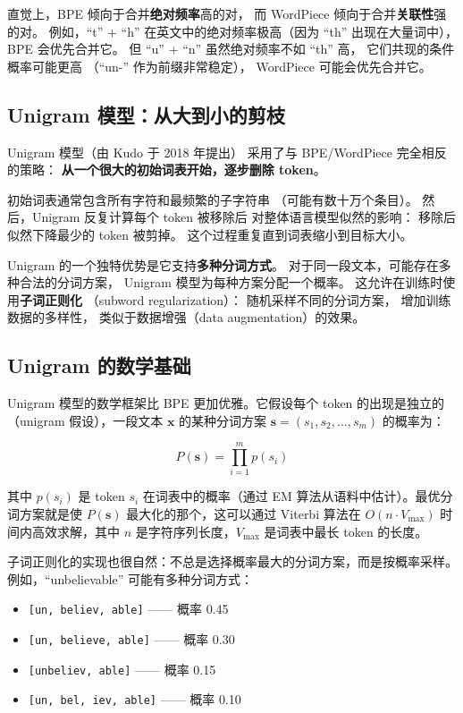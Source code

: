 直觉上，BPE 倾向于合并\textbf{绝对频率}高的对，
而 WordPiece 倾向于合并\textbf{关联性}强的对。
例如，“t” + “h” 在英文中的绝对频率极高（因为 “th” 出现在大量词中），
BPE 会优先合并它。
但 “u” + “n” 虽然绝对频率不如 “th” 高，
它们共现的条件概率可能更高
（“un-” 作为前缀非常稳定），
WordPiece 可能会优先合并它。

\subsection{Unigram 模型：从大到小的剪枝}

Unigram 模型（由 Kudo 于 2018 年提出）
采用了与 BPE/WordPiece 完全相反的策略：
\textbf{从一个很大的初始词表开始，逐步删除 token}。

初始词表通常包含所有字符和最频繁的子字符串
（可能有数十万个条目）。
然后，Unigram 反复计算每个 token 被移除后
对整体语言模型似然的影响：
移除后似然下降最少的 token 被剪掉。
这个过程重复直到词表缩小到目标大小。

Unigram 的一个独特优势是它支持\textbf{多种分词方式}。
对于同一段文本，可能存在多种合法的分词方案，
Unigram 模型为每种方案分配一个概率。
这允许在训练时使用\textbf{子词正则化}
（subword regularization）：
随机采样不同的分词方案，
增加训练数据的多样性，
类似于数据增强（data augmentation）的效果。

\subsection{Unigram 的数学基础}

Unigram 模型的数学框架比 BPE 更加优雅。它假设每个 token 的出现是独立的（unigram 假设），一段文本 $\mathbf{x}$ 的某种分词方案 $\mathbf{s} = (s_1, s_2, \ldots, s_m)$ 的概率为：

\begin{equation}
  P(\mathbf{s}) = \prod_{i=1}^{m} p(s_i)
\end{equation}

其中 $p(s_i)$ 是 token $s_i$ 在词表中的概率（通过 EM 算法从语料中估计）。最优分词方案就是使 $P(\mathbf{s})$ 最大化的那个，这可以通过 Viterbi 算法在 $O(n \cdot V_{\max})$ 时间内高效求解，其中 $n$ 是字符序列长度，$V_{\max}$ 是词表中最长 token 的长度。

子词正则化的实现也很自然：不总是选择概率最大的分词方案，而是按概率采样。例如，“unbelievable” 可能有多种分词方式：
\begin{itemize}[noitemsep]
  \item \texttt{[un, believ, able]} —— 概率 0.45
  \item \texttt{[un, believe, able]} —— 概率 0.30
  \item \texttt{[unbeliev, able]} —— 概率 0.15
  \item \texttt{[un, bel, iev, able]} —— 概率 0.10
\end{itemize}

